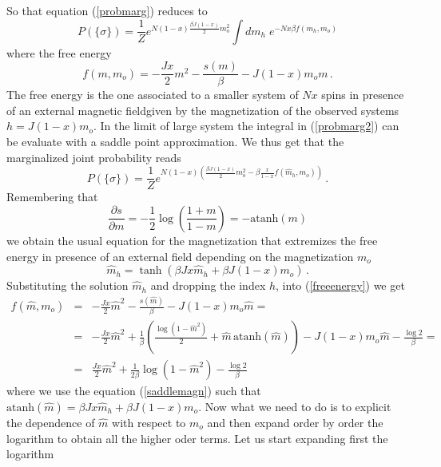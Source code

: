 \documentclass[aps,pre,noshowpacs]{revtex4}
\begin{document}
So that equation (\ref{probmarg}) reduces to
\begin{equation}\label{probmarg2}
P(\{\sigma\}) =\frac{1}{Z}e^{N (1-x)  \frac{\beta J (1-x) }{2} m_o^2} \int dm_h  \;e^{-N x \beta f(m_h,m_o)}
\end{equation}
where the free energy
\begin{equation}\label{freeenergy}
f(m,m_o)=-\frac{J x}{2} m^2 -  \frac{s(m) }{\beta} - J (1-x) m_o m\,.
\end{equation}
The free energy is the one associated to a smaller system of $Nx$ spins in presence of an external magnetic fieldgiven by the
magnetization of the observed systems $h= J(1-x) m_o$. 
In the limit of large system the integral in (\ref{probmarg2}) can be evaluate with a saddle point approximation. 
We thus get that the marginalized joint probability reads
\begin{equation}\label{probmarginal}
P(\{\sigma\}) = \frac{1}{Z}e^{N (1-x) \left(\frac{ \beta J (1-x) }{2} m_o^2 - \beta \frac{x}{1-x} f(\hat{m}_h, m_o)\right)}\,. 
\end{equation}
Remembering that $$\frac{\partial s}{\partial m}= - \frac{1}{2} \log\left(\frac{1+m}{1-m}\right)=-\mbox{atanh}(m)$$
we obtain the usual equation for the magnetization that extremizes the free energy 
in presence of an external field depending on the magnetization $m_o$
\begin{equation} \label{saddlemagn}
\hat{m}_h=\tanh(\beta J x \hat{m}_h + \beta J (1-x) m_o)\,.
\end{equation}
Substituting the solution $\hat{m}_h$ and dropping the index $h$, into (\ref{freeenergy}) we get
\begin{eqnarray}\label{fenergy_mhat}
f(\hat{m},m_o)&=& -\frac{J x}{2 } \hat{m}^2 - \frac{ s(\hat{m})}{\beta} - J (1-x) m_o \hat{m} =\nonumber\\
&=&-\frac{J x}{2} \hat{m}^2 +  \frac{1}{\beta} \left(\frac{ \log(1-\hat{m}^2) }{2}+\hat{m}\, \mbox{atanh}(\hat{m})\right) - J (1-x)  m_o \hat{m} - \frac{\log 2}{\beta}=\nonumber\\
&=&\frac{J x}{2} \hat{m}^2 +  \frac{1}{2\beta } \log(1-\hat{m}^2)- \frac{\log 2}{\beta}
\end{eqnarray}
where we use the equation (\ref{saddlemagn}) such that $\mbox{atanh}(\hat{m})=\beta J x \hat{m}_h + \beta J (1-x) m_o$. 
Now what we need to do is to explicit the dependence of $\hat{m}$ with respect to $m_o$ and then expand order by
order the logarithm to obtain all the higher oder terms. Let us start expanding first the logarithm 
\end{document}
